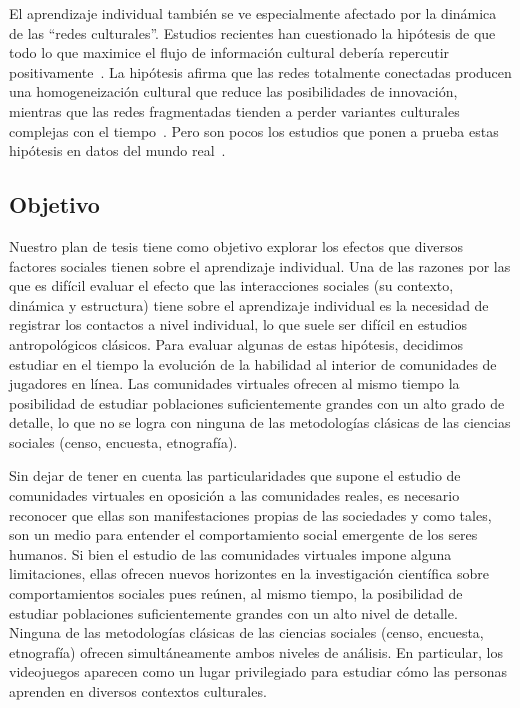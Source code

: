 \documentclass[a4paper,11pt]{book}
\theoremstyle{definition}
\begin{document}

El aprendizaje individual tambi\'en se ve especialmente afectado por la din\'amica de las ``redes culturales''.
%
Estudios recientes han cuestionado la hip\'otesis de que todo lo que maximice el flujo de informaci\'on cultural deber\'ia repercutir positivamente~\cite{Derex2020}.
%
La hip\'otesis afirma que las redes totalmente conectadas producen una homogeneizaci\'on cultural que reduce las posibilidades de innovaci\'on, mientras que las redes fragmentadas tienden a perder variantes culturales complejas con el tiempo~\cite{padilla2022-interconnectivity,derex2018-divideAndConquer,Creanza2017}.
%
Pero son pocos los estudios que ponen a prueba estas hip\'otesis en datos del mundo real~\cite{migliano2017-hunterGathererNetwork, Derex2020}.



\subsection{Objetivo}

Nuestro plan de tesis tiene como objetivo explorar los efectos que diversos factores sociales tienen sobre el aprendizaje individual.
%
Una de las razones por las que es dif\'icil evaluar el efecto que las interacciones sociales (su contexto, din\'amica y estructura) tiene sobre el aprendizaje individual es la necesidad de registrar los contactos a nivel individual, lo que suele ser dif\'icil en estudios antropol\'ogicos cl\'asicos.
%
Para evaluar algunas de estas hip\'otesis, decidimos estudiar en el tiempo la evoluci\'on de la habilidad al interior de comunidades de jugadores en l\'inea.
%
Las comunidades virtuales ofrecen al mismo tiempo la posibilidad de estudiar poblaciones suficientemente grandes con un alto grado de detalle, lo que no se logra con ninguna de las metodolog\'ias cl\'asicas de las ciencias sociales (censo, encuesta, etnograf\'ia).


Sin dejar de tener en cuenta las particularidades que supone el estudio de comunidades virtuales en oposici\'on a las comunidades reales, es necesario reconocer que ellas son manifestaciones propias de las sociedades y como tales, son un medio para entender el comportamiento social emergente de los seres humanos.
%
Si bien el estudio de las comunidades virtuales impone alguna limitaciones, ellas ofrecen nuevos horizontes en la investigaci\'on cient\'ifica sobre comportamientos sociales pues re\'unen, al mismo tiempo, la posibilidad de estudiar poblaciones suficientemente grandes con un alto nivel de detalle.
%
Ninguna de las metodolog\'ias cl\'asicas de las ciencias sociales (censo, encuesta, etnograf\'ia) ofrecen simult\'aneamente ambos niveles de an\'alisis.
%
En particular, los videojuegos aparecen como un lugar privilegiado para estudiar c\'omo las personas aprenden en diversos contextos culturales.
\end{document}
